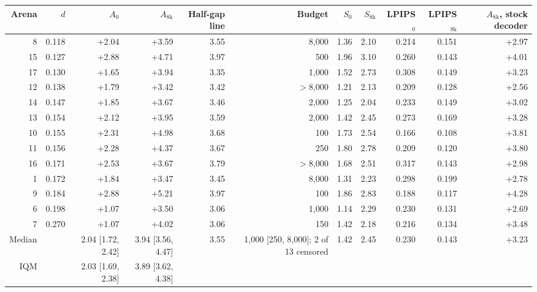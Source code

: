 \begin{tabular}{rrrrrrrrrrr}
\toprule
Arena & $d$ & $A_0$ & $A_{\mathrm{8k}}$ & Half-gap line & Budget & $S_0$ & $S_{\mathrm{8k}}$ & LPIPS$_0$ & LPIPS$_{\mathrm{8k}}$ & $A_{\mathrm{8k}}$, stock decoder \\
\midrule
8 & 0.118 & +2.04 & +3.59 & 3.55 & 8,000 & 1.36 & 2.10 & 0.214 & 0.151 & +2.97 \\
15 & 0.127 & +2.88 & +4.71 & 3.97 & 500 & 1.96 & 3.10 & 0.260 & 0.143 & +4.01 \\
17 & 0.130 & +1.65 & +3.94 & 3.35 & 1,000 & 1.52 & 2.73 & 0.308 & 0.149 & +3.23 \\
12 & 0.138 & +1.79 & +3.42 & 3.42 & ${>}$8,000 & 1.21 & 2.13 & 0.209 & 0.128 & +2.56 \\
14 & 0.147 & +1.85 & +3.67 & 3.46 & 2,000 & 1.25 & 2.04 & 0.233 & 0.149 & +3.02 \\
13 & 0.154 & +2.12 & +3.95 & 3.59 & 2,000 & 1.42 & 2.45 & 0.273 & 0.169 & +3.28 \\
10 & 0.155 & +2.31 & +4.98 & 3.68 & 100 & 1.73 & 2.54 & 0.166 & 0.108 & +3.81 \\
11 & 0.156 & +2.28 & +4.37 & 3.67 & 250 & 1.80 & 2.78 & 0.209 & 0.120 & +3.80 \\
16 & 0.171 & +2.53 & +3.67 & 3.79 & ${>}$8,000 & 1.68 & 2.51 & 0.317 & 0.143 & +2.98 \\
1 & 0.172 & +1.84 & +3.47 & 3.45 & 8,000 & 1.31 & 2.23 & 0.298 & 0.199 & +2.78 \\
9 & 0.184 & +2.88 & +5.21 & 3.97 & 100 & 1.86 & 2.83 & 0.188 & 0.117 & +4.28 \\
6 & 0.198 & +1.07 & +3.50 & 3.06 & 1,000 & 1.14 & 2.29 & 0.230 & 0.131 & +2.69 \\
7 & 0.270 & +1.07 & +4.02 & 3.06 & 150 & 1.42 & 2.18 & 0.216 & 0.134 & +3.48 \\
\midrule
Median &  & 2.04 [1.72, 2.42] & 3.94 [3.56, 4.47] & 3.55 & 1,000 [250, 8,000]; 2 of 13 censored & 1.42 & 2.45 & 0.230 & 0.143 & +3.23 \\
IQM &  & 2.03 [1.69, 2.38] & 3.89 [3.62, 4.38] &  &  &  &  &  &  &  \\
\bottomrule
\end{tabular}
